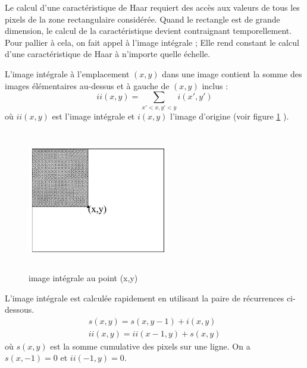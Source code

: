 Le calcul d'une caractéristique de Haar requiert des accès aux valeurs de tous les pixels de la zone rectangulaire considérée. Quand le rectangle est de grande dimension, le calcul de la caractéristique devient contraignant temporellement. Pour pallier à cela, on fait appel à l'image intégrale ; Elle rend constant le calcul d'une caractéristique de Haar à n'importe quelle échelle.

L'image intégrale à l'emplacement $(x, y)$ dans une image contient la somme des images élémentaires au-dessus et à gauche de $(x, y)$ inclus : 
  \[ii(x, y)=\sum_{x'< x, y'< y }{i(x', y')}\] où $ii(x, y)$ est l'image intégrale et $i(x, y)$ l'image d'origine (voir figure \ref{fig:integr} ). 
	\begin{figure}[htbp]
		\centering
			\includegraphics[height=175pt, width=175pt]{integr.JPG}
		\caption{image intégrale au point (x,y)}
		\label{fig:integr}
	\end{figure}
	
L'image intégrale est calculée rapidement en utilisant la paire de récurrences ci-dessous.
 \begin{eqnarray*}
s(x,y)=s(x,y-1)+i(x,y)\\
ii(x,y)=ii(x-1,y)+s(x,y)
\end{eqnarray*}
où $s(x,y)$ est la somme cumulative  des pixels sur une ligne. On a $s(x,-1)= 0$ et  $ii(-1,y) =0$.


